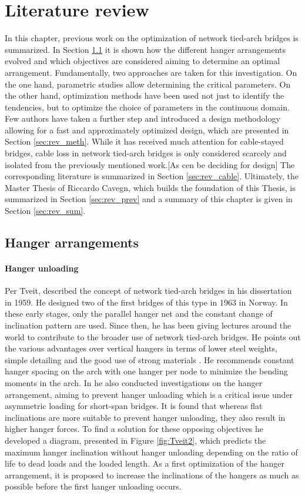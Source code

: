\section{Literature review}\label{sec:review}
In this chapter, previous work on the optimization of network tied-arch bridges is summarized. In Section \ref{sec:rev_arr} it is shown how the different hanger arrangements evolved and which objectives are considered aiming to determine an optimal arrangement. Fundamentally, two approaches are taken for this investigation. On the one hand, parametric studies allow determining the critical parameters. On the other hand, optimization methods have been used not just to identify the tendencies, but to optimize the choice of parameters in the continuous domain. Few authors have taken a further step and introduced a design methodology allowing for a fast and approximately optimized design, which are presented in Section \ref{sec:rev_meth}. While it has received much attention for cable-stayed bridges, cable loss in network tied-arch bridges is only considered scarcely and isolated from the previously mentioned work.[As cen be deciding for design] The corresponding literature is summarized in Section \ref{sec:rev_cable}. Ultimately, the Master Thesis of Riccardo Cavegn, which builds the foundation of this Thesis, is summarized in Section \ref{sec:rev_prev} and a summary of this chapter is given in Section \ref{sec:rev_sum}.

\subsection{Hanger arrangements}\label{sec:rev_arr}
\paragraph*{Hanger unloading}
Per Tveit, described the concept of network tied-arch bridges in his dissertation in 1959. He designed two of the first bridges of this type in 1963 in Norway. In these early stages, only the parallel hanger net and the constant change of inclination pattern are used. Since then, he has been giving lectures around the world to contribute to the broader use of network tied-arch bridges. He points out the various advantages over vertical hangers in terms of lower steel weights, simple detailing and the good use of strong materials \citep{Tveit}. He recommends constant hanger spacing on the arch with one hanger per node to minimize the bending moments in the arch. In \cite{Tveit3} he also conducted investigations on the hanger arrangement, aiming to prevent hanger unloading which is a critical issue under asymmetric loading for short-span bridges. It is found that whereas flat inclinations are more suitable to prevent hanger unloading, they also result in higher hanger forces. To find a solution for these opposing objectives he developed a diagram, presented in Figure \ref{fig:Tveit2}, which predicts the maximum hanger inclination without hanger unloading depending on the ratio of life to dead loads and the loaded length. As a first optimization of the hanger arrangement, it is proposed to increase the inclinations of the hangers as much as possible before the first hanger unloading occurs.

